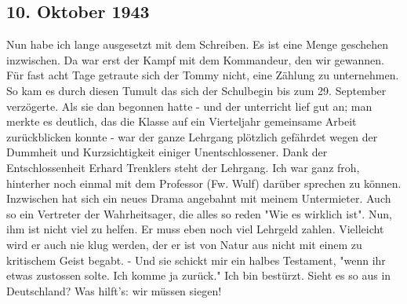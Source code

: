 \subsection{10. Oktober 1943}

Nun habe ich lange ausgesetzt mit dem Schreiben.
Es ist eine Menge geschehen inzwischen.
Da war erst der Kampf mit dem Kommandeur, den wir gewannen.
F\"{u}r fast acht Tage getraute sich der Tommy nicht, eine Z\"{a}hlung zu unternehmen.
So kam es durch diesen Tumult das sich der Schulbegin bis zum 29. September verz\"{o}gerte.
Als sie dan begonnen hatte - und der unterricht lief gut an; man merkte es deutlich, das die Klasse auf ein Vierteljahr gemeinsame Arbeit zur\"{u}ckblicken konnte - war der ganze Lehrgang pl\"{o}tzlich gef\"{a}hrdet wegen der Dummheit und Kurzsichtigkeit einiger Unentschlossener.
Dank der Entschlossenheit Erhard Trenklers steht der Lehrgang.
Ich war ganz froh, hinterher noch einmal mit dem Professor (Fw. Wulf) dar\"{u}ber sprechen zu k\"{o}nnen.
Inzwischen hat sich ein neues Drama angebahnt mit meinem Untermieter.
Auch so ein Vertreter der Wahrheitsager, die alles so reden "Wie es wirklich ist".
Nun, ihm ist nicht viel zu helfen.
Er muss eben noch viel Lehrgeld zahlen.
Vielleicht wird er auch nie klug werden, der er ist von Natur aus nicht mit einem zu kritischem Geist begabt.
- Und sie schickt mir ein halbes Testament, "wenn ihr etwas zustossen solte. Ich komme ja zur\"{u}ck."
Ich bin best\"{u}rzt.
Sieht es so aus in Deutschland?
Was hilft's: wir m\"{u}ssen siegen!

\clearpage
